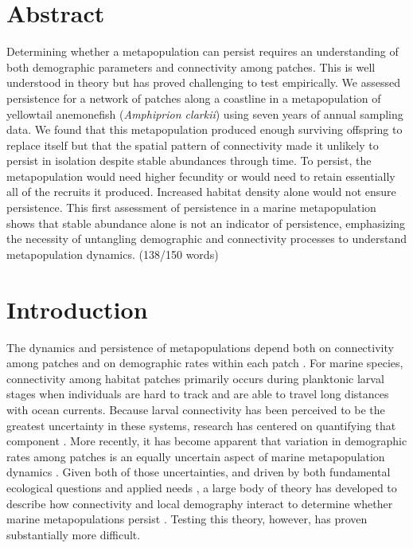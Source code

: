 \documentclass[12pt, oneside]{article}   	%
\begin{document}
\bigskip

\section*{Abstract}
Determining whether a metapopulation can persist requires an understanding of both demographic parameters and connectivity among patches. This is well understood in theory but has proved challenging to test empirically. We assessed persistence for a network of patches along a coastline in a metapopulation of yellowtail anemonefish (\textit{Amphiprion clarkii}) using seven years of annual sampling data. We found that this metapopulation produced enough surviving offspring to replace itself but that the spatial pattern of connectivity made it unlikely to persist in isolation despite stable abundances through time. To persist, the metapopulation would need higher fecundity or would need to retain essentially all of the recruits it produced. Increased habitat density alone would not ensure persistence. This first assessment of persistence in a marine metapopulation shows that stable abundance alone is not an indicator of persistence, emphasizing the necessity of untangling demographic and connectivity processes to understand metapopulation dynamics. (138/150 words)



\section*{Introduction}
The dynamics and persistence of metapopulations depend both on connectivity among patches and on demographic rates within each patch \citep{hastings_persistence_2006, hanski1998metapopulation}. For marine species, connectivity among habitat patches primarily occurs during planktonic larval stages when individuals are hard to track and are able to travel long distances with ocean currents. Because larval connectivity has been perceived to be the greatest uncertainty in these systems, research has centered on quantifying that component \citep[reviewed by][]{white2019connectivity}. More recently, it has become apparent that variation in demographic rates among patches is an equally uncertain aspect of marine metapopulation dynamics \citep{hameed2016inverse, white2011oceanographic}. Given both of those uncertainties, and driven by both fundamental ecological questions and applied needs \citep{botsford_dependence_2001,white_population_2010}, a large body of theory has developed to describe how connectivity and local demography interact to determine whether marine metapopulations persist \citep{burgess2014beyond, botsford2019population}. Testing this theory, however, has proven substantially more difficult.
\end{document}
